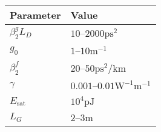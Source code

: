 \documentclass[12pt]{article}
\newcommand{\Es}{E_{\textrm{sat}}}
\begin{document}
\begin{table}
\begin{center}
\begin{tabular}{|l|l|}
\hline
Parameter & Value \\
\hline
$\beta_2^g L_D$ & $10$--$2000 \text{ps}^2$ \\
$g_0$ & $1$--$10 \text{m}^{-1}$ \\
$\beta_2^f$ & $20$--$50 \text{ps}^2/ \text{km}$ \\
$\gamma$ & $0.001$--$0.01 \text{W}^{-1} \text{m}^{-1}$ \cite{agrawal2013} \\
$\Es$ & $10^4 \text{pJ}$ \\
$L_G$ & $2$--$3 \text{m}$ \cite{burgoyne2014, shtyrina, yarutkina} \\
\hline
\end{tabular}
\caption{}
\label{tab:values}
\end{center}
\end{table}


\newpage
\printbibliography
\end{document}

